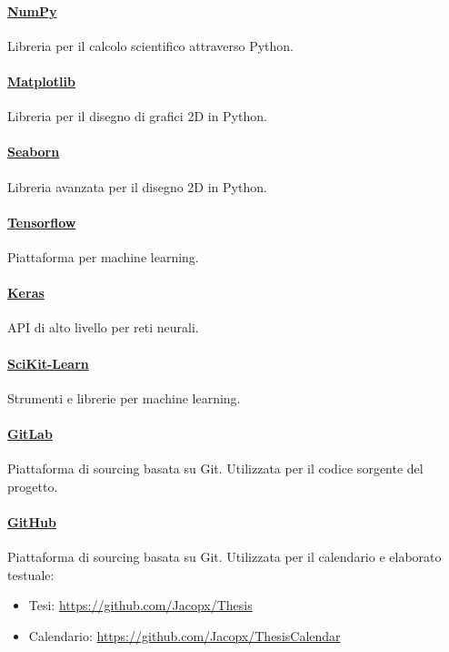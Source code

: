 \documentclass[%
    corpo=12pt,
    twoside,
    oldstyle,
    autoretitolo,
    greek,
    evenboxes,
]{toptesi}
\begin{document}
\paragraph{\href{https://numpy.org/}{NumPy}} Libreria per il calcolo scientifico attraverso Python.

\paragraph{\href{https://matplotlib.org/}{Matplotlib}} Libreria per il disegno di grafici 2D in Python.

\paragraph{\href{https://seaborn.pydata.org/}{Seaborn}} Libreria avanzata per il disegno 2D in Python.

\paragraph{\href{https://www.tensorflow.org/}{Tensorflow}} Piattaforma per machine learning.

\paragraph{\href{https://keras.io/}{Keras}} API di alto livello per reti neurali.

\paragraph{\href{https://scikit-learn.org/stable/}{SciKit-Learn}} Strumenti e librerie per machine learning.

\paragraph{\href{https://gitlab.com}{GitLab}} Piattaforma di sourcing basata su Git. Utilizzata per il codice sorgente del progetto.

\paragraph{\href{https://github.com}{GitHub}} Piattaforma di sourcing basata su Git. Utilizzata per il calendario e elaborato testuale:
\begin{itemize}
  \item Tesi: \url{https://github.com/Jacopx/Thesis}
  \item Calendario: \url{https://github.com/Jacopx/ThesisCalendar}
\end{itemize}
\end{document}
